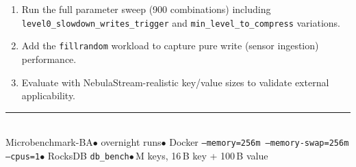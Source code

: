 \documentclass[10pt,a4paper]{scrartcl}
\begin{document}
\begin{enumerate}
  \item Run the full parameter sweep (900 combinations) including
        \texttt{level0\_slowdown\_writes\_trigger} and
        \texttt{min\_level\_to\_compress} variations.
  \item Add the \texttt{fillrandom} workload to capture pure write (sensor ingestion) performance.
  \item Evaluate with NebulaStream-realistic key/value sizes to validate external applicability.
\end{enumerate}

\vfill
\noindent\color{footergray}\rule{\textwidth}{0.3pt}\\[2pt]
{\footnotesize\color{footergray}
  Microbenchmark-BA\enspace$\bullet$ overnight runs\enspace$\bullet$\enspace
  Docker \texttt{--memory=256m --memory-swap=256m --cpus=1}\enspace$\bullet$\enspace
  RocksDB \texttt{db\_bench}\enspace$\bullet$\,M keys, 16\,B key + 100\,B value}
\end{document}
